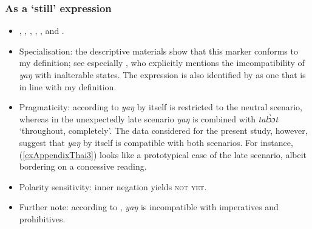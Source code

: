 	
\subsubsection{As a \lq{}still\rq{ }expression}
	\label{appendixThaiStill}
		\begin{itemize}
			\item \Textcite{vanBaar1997}, \textcite[100]{CampbellShaweevongs1982}, \textcite[95–97, 105–106]{HigbieThinsan2002}, \textcite[153, 156]{IwasakiIngkaphirom2005}, \textcite{Jenny2001}, \textcite[81, 182]{Noss1964} and \textcite[103, 139–140]{Smyth2002}.
			\item Specialisation: the descriptive materials show that this marker conforms to my definition; see especially \textcite[118]{Jenny2001}, who explicitly mentions the imcompatibility of \textit{yaŋ} with inalterable states. The expression is also identified by \textcite{vanBaar1997} as one that is in line with my definition.
			\item Pragmaticity: according to \textcite[76]{vanBaar1997} \textit{yaŋ} by itself is restricted to the neutral scenario, whereas in the unexpectedly late scenario \textit{yaŋ} is combined with \textit{talɔ̀ɔt} \lq throughout, completely'. The data considered for the present study, however, suggest that \textit{yaŋ} by itself is compatible with both scenarios. For instance, (\ref{exAppendixThai3}) looks like a prototypical case of the late scenario, albeit bordering on a concessive reading.
	\item Polarity sensitivity: inner negation yields \textsc{not yet}.
	\item Further note: according to \textcite{Jenny2001}, \textit{yaŋ} is incompatible with imperatives and prohibitives.
	\end{itemize}

